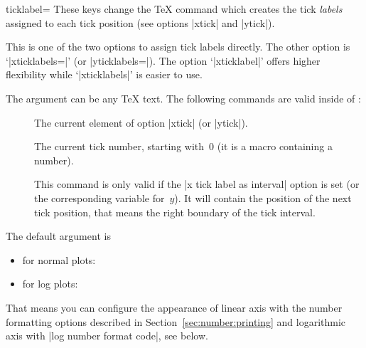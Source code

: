 \begin{pgfplotsxykey}{\x ticklabel=}
    These keys change the \TeX{} command which creates the tick \emph{labels}
    assigned to each tick position (see options |xtick| and |ytick|).

    This is one of the two options to assign tick labels directly. The other
    option is `|xticklabels=|' (or |yticklabels=|). The option `|xticklabel|' offers higher flexibility while
    `|xticklabels|' is easier to use.

    The argument  can be any \TeX{} text. The following commands
    are valid inside of :
    \begin{description}
        \item[] \declareandlabel{\tick} The current element of option |xtick|
            (or |ytick|).
        \item[] \declareandlabel{\ticknum} The current tick number, starting
            with~0 (it is a macro containing a number).
        \item[] \declareandlabel{\nexttick} This command is only valid if the
            |x tick label as interval| option is set (or the corresponding
            variable for~$y$). It will contain the position of the next tick
            position, that means the right boundary of the tick interval.
    \end{description}
    The default argument is
    \begin{itemize}
        \item \declareandlabel{\axisdefaultticklabel} for normal plots:
\begin{codeexample}
\def\axisdefaultticklabel{$\pgfmathprintnumber{\tick}$}
\end{codeexample}
        \item \declareandlabel{\axisdefaultticklabellog} for log plots:
\begin{codeexample}
\def\axisdefaultticklabellog{%
    \pgfkeysgetvalue{/pgfplots/log number format code/.@cmd}\pgfplots@log@label@style
    \expandafter\pgfplots@log@label@style\tick\pgfeov
}
\end{codeexample}
    \end{itemize}
    That means you can configure the appearance of linear axis with the number
    formatting options described in Section~\ref{sec:number:printing} and
    logarithmic axis with |log number format code|, see below.


\end{pgfplotsxykey}

